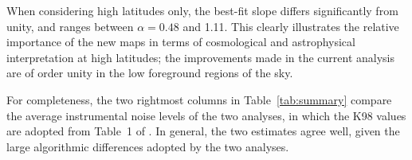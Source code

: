 \documentclass{aa}
\def\Cosmoglobe{\textsc{Cosmoglobe}}
\begin{document}
When considering high latitudes only, the best-fit slope differs
significantly from unity, and ranges between $\alpha=0.48$ and
1.11. This clearly illustrates the relative importance of the new maps
in terms of cosmological and astrophysical interpretation at high
latitudes; the improvements made in the current analysis are of order
unity in the low foreground regions of the sky. 

For completeness, the two rightmost columns in Table~\ref{tab:summary}
compare the average instrumental noise levels of the two analyses,
in which the K98 values are adopted from Table~1 of
\citet{hauser1998}. In general, the two estimates agree well, given
the large algorithmic differences adopted by the two analyses.


%       
%       
%       
%       
%       
\end{document}
